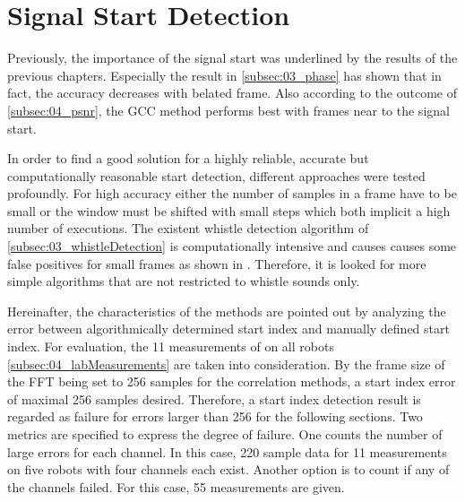 \newpage
\section{Signal Start Detection}
\label{sec:04_signalStartDetection}


Previously, the importance of the signal start was underlined
by the results of the previous chapters.
Especially the result in \cref{subsec:03_phase} has shown that in fact, the accuracy
decreases with belated frame.
Also according to the outcome of \cref{subsec:04_psnr}, the \ac{GCC}
method performs best with frames near to the signal start. 

In order to find a good solution for a highly reliable, accurate but
computationally reasonable start detection, different approaches were
tested profoundly.
For high accuracy either the number of samples in a frame have to be
small or the window must be shifted with small steps which both implicit
a high number of executions.
The existent whistle detection algorithm of \cref{subsec:03_whistleDetection}
is computationally intensive and causes causes some false positives
for small frames as shown in \label{subsec:04_whistleDetection}.
Therefore, it is looked for more simple algorithms that are not restricted
to whistle sounds only.

Hereinafter, the characteristics of the methods are pointed out by
analyzing the error between algorithmically determined start index
and manually defined start index.
For evaluation, the 11 measurements of on all robots \cref{subsec:04_labMeasurements}
are taken into consideration.
By the frame size of the \ac{FFT} being set to 256 samples for the
correlation methods, a start index error of maximal 256 samples
desired.
Therefore, a start index detection result is regarded as failure for errors
larger than 256 for the following sections.
Two metrics are specified to express the degree of failure.
One counts the number of large errors for each channel.
In this case, 220 sample data for 11 measurements on five robots with
four channels each exist.
Another option is to count if any of the channels failed.
For this case, 55 measurements are given.

